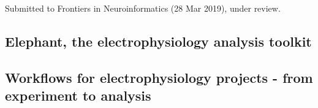 Submitted to Frontiers in Neuroinformatics (28 Mar 2019), under review.




\subsection*{Elephant, the electrophysiology analysis toolkit}
\subsection*{Workflows for electrophysiology projects - from experiment to analysis}


